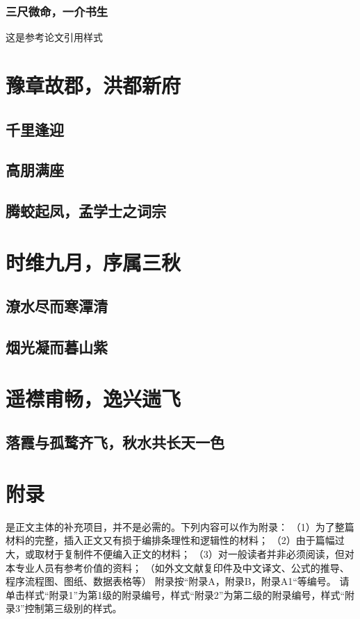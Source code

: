 \documentclass{QHUMaster}
\begin{document}
\subsection{三尺微命，一介书生}
这是参考论文引用样式\cite{kocher99,cnproceed}

\zhlipsum[1-3]
\chapter{豫章故郡，洪都新府}
\section{千里逢迎}
\zhlipsum[1-3]
\section{高朋满座}
\zhlipsum[1-5]
\section{腾蛟起凤，孟学士之词宗}
\chapter{时维九月，序属三秋}
\zhlipsum[1-3]
\section{潦水尽而寒潭清}
\zhlipsum[1-5]
\section{烟光凝而暮山紫}
\chapter{遥襟甫畅，逸兴遄飞}
\zhlipsum[1-3]
\section{落霞与孤鹜齐飞，秋水共长天一色}
\zhlipsum[1-5]

\backmatter
\printbib

\chapter{附\quad 录}
是正文主体的补充项目，并不是必需的。下列内容可以作为附录：
（1）为了整篇材料的完整，插入正文又有损于编排条理性和逻辑性的材料；
（2）由于篇幅过大，或取材于复制件不便编入正文的材料；
（3）对一般读者并非必须阅读，但对本专业人员有参考价值的资料；
（如外文文献复印件及中文译文、公式的推导、程序流程图、图纸、数据表格等）
附录按“附录A，附录B，附录A1“等编号。
请单击样式“附录1”为第1级的附录编号，样式“附录2”为第二级的附录编号，样式“附录3”控制第三级别的样式。
\end{document}
